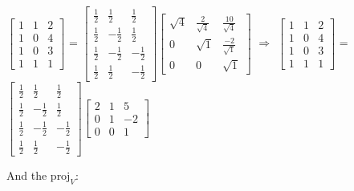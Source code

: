 \begin{tbox}
        \hspace{0.5cm}
        $\begin{bmatrix}
            1 & 1 & 2 \\
            1 & 0 & 4 \\
            1 & 0 & 3 \\
            1 & 1 & 1 
        \end{bmatrix}$ =
        $\begin{bmatrix}
            \frac{1}{2} & \frac{1}{2} & \frac{1}{2} \\
            \frac{1}{2} & -\frac{1}{2} & \frac{1}{2} \\
            \frac{1}{2} & -\frac{1}{2} & -\frac{1}{2} \\
            \frac{1}{2} & \frac{1}{2} & -\frac{1}{2}
        \end{bmatrix}
        \begin{bmatrix}
            \sqrt{4} & \frac{2}{\sqrt{4}} & \frac{10}{\sqrt{4}} \\
            0 & \sqrt{1} & \frac{-2}{\sqrt{1}} \\
            0 & 0 & \sqrt{1}
        \end{bmatrix}$
        \hspace{0.5cm}
        $\Rightarrow$
        \hspace{0.5cm}
        $\begin{bmatrix}
            1 & 1 & 2 \\
            1 & 0 & 4 \\
            1 & 0 & 3 \\
            1 & 1 & 1 
        \end{bmatrix}$ =
        $\begin{bmatrix}
            \frac{1}{2} & \frac{1}{2} & \frac{1}{2} \\
            \frac{1}{2} & -\frac{1}{2} & \frac{1}{2} \\
            \frac{1}{2} & -\frac{1}{2} & -\frac{1}{2} \\
            \frac{1}{2} & \frac{1}{2} & -\frac{1}{2}
        \end{bmatrix}
        \begin{bmatrix}
            2 & 1 & 5 \\
            0 & 1 & -2 \\
            0 & 0 & 1
        \end{bmatrix}$
        \normalsize

        And the $\text{proj}_V$:


\end{tbox}
